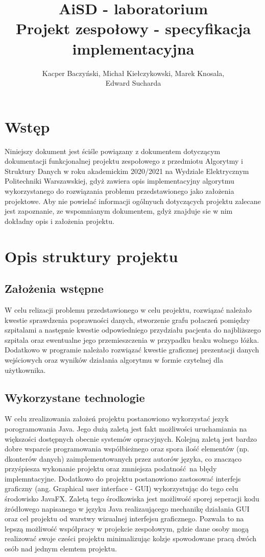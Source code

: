 \documentclass[10pt,a4paper]{article}
\title{\huge AiSD - laboratorium \\ \Large Projekt zespołowy - specyfikacja implementacyjna}
\author{Kacper Baczyński, Michał Kiełczykowski, Marek Knosala, \\ Edward Sucharda}
\begin{document}
\maketitle

\section{Wstęp}

Niniejszy dokument jest ściśle powiązany z dokumentem dotyczącym dokumentacji funkcjonalnej projektu zespołowego z przedmiotu Algorytmy i Struktury Danych w roku akademickim 2020/2021 na Wydziale Elektrycznym Politechniki Warszawskiej, 
gdyż zawiera opis implementacyjny algorytmu wykorzystanego do rozwiązania problemu przedstawionego jako założenia projektowe. 
Aby nie powielać informacji ogólnyuch dotyczących projektu zalecane jest zapoznanie, ze wspomnianym dokumentem, gdyż znajduje sie w nim dokładny opis i założenia projektu.

\section{Opis struktury projektu}

\subsection{Założenia wstępne}


W celu relizacji problemu przedstawionego w celu projektu, rozwiązać należało kwestie sprawdzenia poprawności danych, stworzenie grafu połaczeń pomiędzy szpitalami a następnie kwestie odpowiedniego przydziału pacjenta do najbliższego 
szpitala oraz ewentualne jego przemieszczenia w przypadku braku wolnego łóżka. Dodatkowo w programie należało rozwiązać kwestie graficznej prezentacji danych wejściowych oraz wyników działania algorytmu w formie czytelnej dla użytkownika.

\subsection{Wykorzystane technologie}

W celu zrealizowania założeń projektu postanowiono wykorzystać jezyk porogramowania Java. Jego dużą zaletą jest fakt możliwości uruchamiania na większości dostępnych obecnie systemów opracyjnych. Kolejną zaletą jest bardzo dobre wsparcie 
programowania współbieżnego oraz spora ilość elementów (np. dkonterów danych) zaimplementowanych przez autorów języka, co znacząco przyśpiesza wykonanie projektu oraz zmniejsza podatność na błędy implemntacyjne. 
Dodatkowo do projektu postanowiono zastosować interfejs graficzny (ang. Graphical user interface - GUI) wykorzystując do tego celu środowisko JavaFX. Zaletą tego środkowiska jest możliwość sporej seperacji kodu żródłowego napisanego w języku Java 
realizaującego mechanikę działania GUI oraz cel projektu od warstwy wizualnej interfejsu graficznego. Pozwala to na lepszą możliwość współpracy w projekcie zespołowym, gdzie dane osoby mogą realizować swoje cześci projektu 
minimalizując kolzje spowodowane pracą dwóch osób nad jednym elemtem projektu. 
\end{document}
